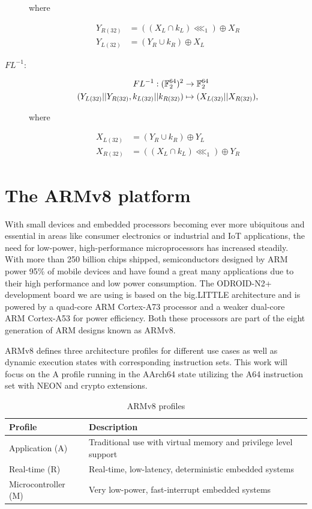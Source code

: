 \begin{description}
where

\begin{align*}
    Y_{R(32)}&=((X_L\cap k_{L})\lll_1)\oplus X_{R} \\
    Y_{L(32)}&=(Y_R\cup k_{R})\oplus X_{L}
\end{align*}

\item[$FL^{-1}$:]

\begin{align*}
    FL^{-1}:(\mathbb{F}_2^{64})^2 &\rightarrow \mathbb{F}_2^{64} \\
    (Y_{L(32)}||Y_{R(32)},k_{L(32)}||k_{R(32)})&\mapsto (X_{L(32)}||X_{R(32)}),
\end{align*}

where

\begin{align*}
    X_{L(32)}&=(Y_R\cup k_{R})\oplus Y_{L} \\
    X_{R(32)}&=((X_L\cap k_{L})\lll_1)\oplus Y_{R}
\end{align*}
\end{description}

\section{The ARMv8 platform}

With small devices and embedded processors becoming ever more ubiquitous and
essential in areas like consumer electronics or industrial and IoT
applications, the need for low-power, high-performance microprocessors has
increased steadily. With more than 250 billion chips shipped, semiconductors
designed by ARM power 95\% of mobile devices and have found a great many
applications due to their high performance and low power
consumption\cite{armcompany}. The ODROID-N2+\cite{odroidn2} development board
we are using is based on the big.LITTLE architecture and is powered by a
quad-core ARM Cortex-A73 processor and a weaker dual-core ARM Cortex-A53 for
power efficiency. Both these processors are part of the eight generation of ARM
designs known as ARMv8\cite{armv8:2013}.

ARMv8 defines three architecture profiles for different use cases as well as
dynamic execution states with corresponding instruction sets. This work will
focus on the A profile running in the AArch64 state utilizing the A64
instruction set with NEON and crypto extensions.

\begin{table}[h!]
    \centering
    \caption{ARMv8 profiles}
    \begin{tabularx}{\textwidth}{lX}
        \toprule
        Profile & Description \\
        \midrule
        Application (A) & Traditional use with virtual memory and privilege level support \\
        Real-time (R) & Real-time, low-latency, deterministic embedded systems \\
        Microcontroller (M) & Very low-power, fast-interrupt embedded systems \\
        \bottomrule
    \end{tabularx}
\end{table}


